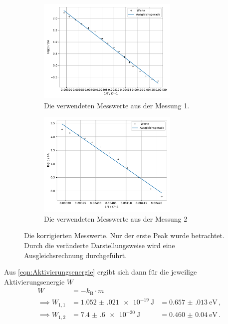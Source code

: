   \begin{figure}[H]
    \begin{subfigure}[b]{.5\linewidth}
      \centering
      \includegraphics[height=5cm, keepaspectratio]{build/log(I)_1durchT_1.pdf}
      \caption{Die verwendeten Messwerte aus der Messung 1.}
      \label{fig:log_I_1_durch_T_Messung_1}
    \end{subfigure}
    \begin{subfigure}[b]{.5\linewidth}
      \centering
      \includegraphics[height=5cm, keepaspectratio]{build/log(I)_1durchT_2.pdf}
      \caption{Die verwendeten Messwerte aus der Messung 2}
      \label{fig:log_I_1_durch_T_Messung 2}
    \end{subfigure}
    \caption{Die korrigierten Messwerte. Nur der erste Peak wurde betrachtet. Durch die veränderte Darstellungsweise wird eine Ausgleichsrechnung durchgeführt.}
  \end{figure} %

  \noindent
  Aus \eqref{eqn:Aktivierungsenergie} ergibt sich dann für die jeweilige Aktivierungsenergie $W$
  \begin{align*}
    W   &= -k_\text{B} \cdot m \\
    \implies W_{1,1} &= \SI{1.052(021)e-19}{\joule} &= \SI{0.657(013)}{\electronvolt} \, , \\
    \implies W_{1,2} &= \SI{7.4(6)e-20}{\joule} &= \SI{0.460(40)}{\electronvolt}  \, .\\
  \end{align*}

